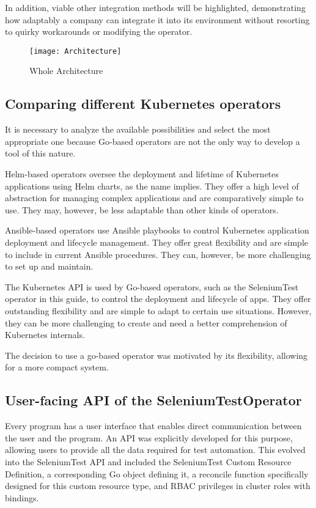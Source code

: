 In addition, viable other integration methods will be highlighted, demonstrating how adaptably a company can integrate it into its environment without resorting to quirky workarounds or modifying the operator.

\begin{figure}[H]
	\centering
	\texttt{[image: Architecture]}
	\label{fig:architecture}
	\caption{Whole Architecture}
\end{figure}

\subsection{Comparing different Kubernetes operators}

It is necessary to analyze the available possibilities and select the most appropriate one because Go-based operators are not the only way to develop a tool of this nature.

Helm-based operators oversee the deployment and lifetime of Kubernetes applications using Helm charts, as the name implies. They offer a high level of abstraction for managing complex applications and are comparatively simple to use. They may, however, be less adaptable than other kinds of operators.

Ansible-based operators use Ansible playbooks to control Kubernetes application deployment and lifecycle management. They offer great flexibility and are simple to include in current Ansible procedures. They can, however, be more challenging to set up and maintain.

The Kubernetes API is used by Go-based operators, such as the SeleniumTest operator in this guide, to control the deployment and lifecycle of apps. They offer outstanding flexibility and are simple to adapt to certain use situations. However, they can be more challenging to create and need a better comprehension of Kubernetes internals.

The decision to use a go-based operator was motivated by its flexibility, allowing for a more compact system.

\subsection{User-facing API of the SeleniumTestOperator}

Every program has a user interface that enables direct communication between the user and the program. An API was explicitly developed for this purpose, allowing users to provide all the data required for test automation. This evolved into the SeleniumTest API and included the SeleniumTest Custom Resource Definition, a corresponding Go object defining it, a reconcile function specifically designed for this custom resource type, and RBAC privileges in cluster roles with bindings.

